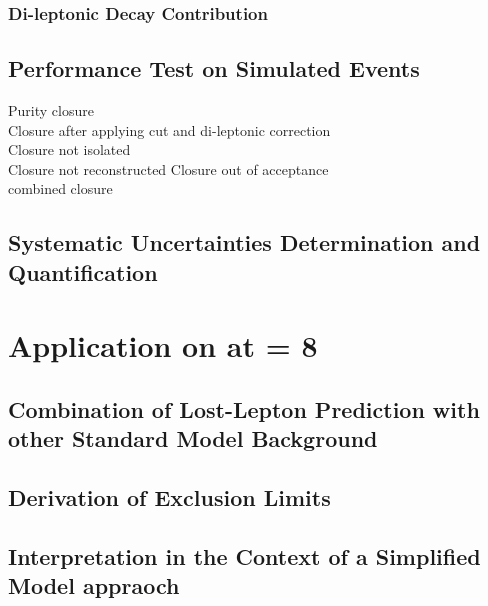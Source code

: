 \subsection{Di-leptonic \ttbar Decay Contribution}
\label{sec:Lost_Lepton_8TeV_Di_Lep}

\section{Performance Test on Simulated Events}
\todo Purity closure\\
\todo Closure after applying \mt cut and di-leptonic correction\\
\todo Closure not isolated\\
\todo Closure not reconstructed
\todo Closure out of acceptance\\
\todo combined closure\\

\section{Systematic Uncertainties Determination and Quantification}

\chapter{Application on \lumi at \CM = 8 \tev}
\section{Combination of Lost-Lepton Prediction with other Standard Model Background}
\section{Derivation of Exclusion Limits}
\label{sec:Lost_Lepton_8TeV_RA2_Limits}
\section{Interpretation in the Context of a Simplified Model appraoch}
\label{sec:Lost_Lepton_8TeV_RA2_SMS}
